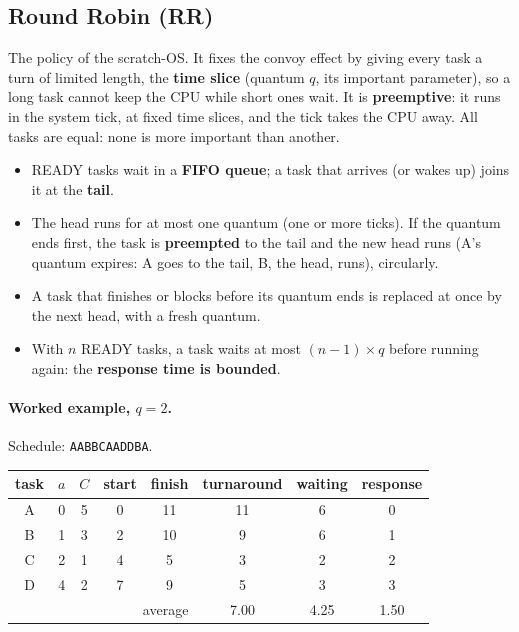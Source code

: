 \subsection{Round Robin (RR)}
The policy of the scratch-OS. It fixes the convoy effect by giving every task a turn of limited length, the \textbf{time slice} (quantum $q$, its important parameter), so a long task cannot keep the CPU while short ones wait. It is \textbf{preemptive}: it runs in the system tick, at fixed time slices, and the tick takes the CPU away. All tasks are equal: none is more important than another.
\begin{itemize}
    \item READY tasks wait in a \textbf{FIFO queue}; a task that arrives (or wakes up) joins it at the \textbf{tail}.
    \item The head runs for at most one quantum (one or more ticks). If the quantum ends first, the task is \textbf{preempted} to the tail and the new head runs (A's quantum expires: A goes to the tail, B, the head, runs), circularly.
    \item A task that finishes or blocks before its quantum ends is replaced at once by the next head, with a fresh quantum.
    \item With $n$ READY tasks, a task waits at most $(n-1)\times q$ before running again: the \textbf{response time is bounded}.
\end{itemize}

\paragraph{Worked example, $q = 2$.} Schedule: \texttt{AABBCAADDBA}.

\begin{center}
    \begin{tabular}{c c c | c c c c c}
        \hline
        task & $a$ & $C$ & start & finish & turnaround & waiting & response \\
        \hline
        A & 0 & 5 & 0 & 11 & 11 & 6 & 0 \\
        B & 1 & 3 & 2 & 10 & 9 & 6 & 1 \\
        C & 2 & 1 & 4 & 5 & 3 & 2 & 2 \\
        D & 4 & 2 & 7 & 9 & 5 & 3 & 3 \\
        \hline
        \multicolumn{5}{r}{average} & 7.00 & 4.25 & 1.50 \\
    \end{tabular}
\end{center}

